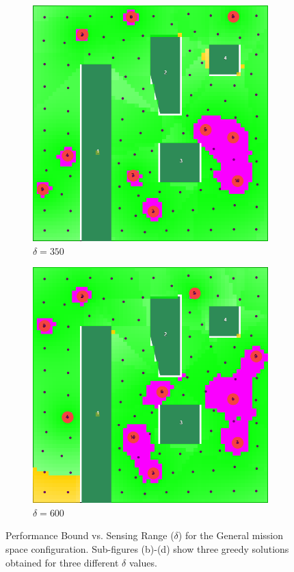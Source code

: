 \documentclass[conference]{IEEEtran}
\begin{document}
\begin{figure}[!b]
\begin{subfigure}[t]{0.105\textwidth}
        \includegraphics[width=\textwidth]{Figures/Gen1_2.png}
        \caption{$\delta=350$}
    \end{subfigure}\hspace{3mm}
    \begin{subfigure}[t]{0.105\textwidth}
        \centering
        \includegraphics[width=\textwidth]{Figures/Gen1_3.png}
        \caption{$\delta=600$}
    \end{subfigure}
    \caption{Performance Bound vs. Sensing Range ($\delta$) for the General mission space configuration. Sub-figures (b)-(d) show three greedy solutions obtained for three different $\delta$ values.}
    \label{Fig:GeneralConfigBetaVsRange}
\end{figure}
\end{document}
